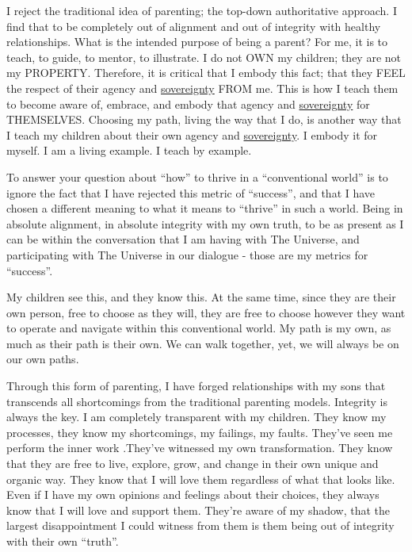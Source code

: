\documentclass{article}
\begin{document}
I reject the traditional idea of parenting; the top-down authoritative approach. I find that to be completely out of alignment and out of integrity with healthy relationships. What is the intended purpose of being a parent? For me, it is to teach, to guide, to mentor, to illustrate. I do not OWN my children; they are not my PROPERTY. Therefore, it is critical that I embody this fact; that they FEEL the respect of their agency and \hyperlink{gloss:sovereignty}{sovereignty} FROM me. This is how I teach them to become aware of, embrace, and embody that agency and \hyperlink{gloss:sovereignty}{sovereignty} for THEMSELVES. Choosing my path, living the way that I do, is another way that I teach my children about their own agency and \hyperlink{gloss:sovereignty}{sovereignty}. I embody it for myself. I am a living example. I teach by example.

To answer your question about ``how'' to thrive in a ``conventional world'' is to ignore the fact that I have rejected this metric of ``success'', and that I have chosen a different meaning to what it means to ``thrive'' in such a world. Being in absolute alignment, in absolute integrity with my own truth, to be as present as I can be within the conversation that I am having with The Universe, and participating with The Universe in our dialogue - those are my metrics for ``success''.

My children see this, and they know this. At the same time, since they are their own person, free to choose as they will, they are free to choose however they want to operate and navigate within this conventional world. My path is my own, as much as their path is their own. We can walk together, yet, we will always be on our own paths.

Through this form of parenting, I have forged relationships with my sons that transcends all shortcomings from the traditional parenting models. Integrity is always the key. I am completely transparent with my children. They know my processes, they know my shortcomings, my failings, my faults. They've seen me perform the inner work .They've witnessed my own transformation. They know that they are free to live, explore, grow, and change in their own unique and organic way. They know that I will love them regardless of what that looks like. Even if I have my own opinions and feelings about their choices, they always know that I will love and support them. They're aware of my shadow, that the largest disappointment I could witness from them is them being out of integrity with their own ``truth''.
\end{document}
